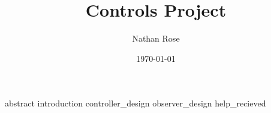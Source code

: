 \documentclass[11pt]{article}
\title{Controls Project}
\author{Nathan Rose}
\date{\today}
\begin{document}
\maketitle
{abstract}
{introduction}
{controller_design}
{observer_design}
{help_recieved}
\end{document}
